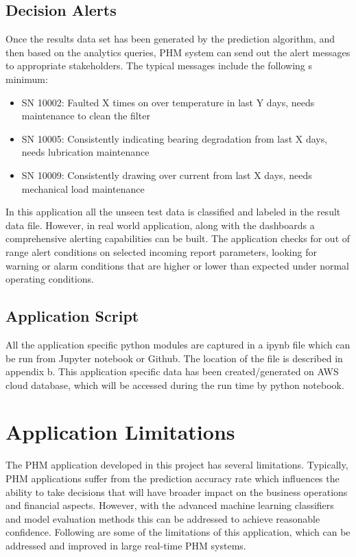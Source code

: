 \documentclass[sigconf]{acmart}
\begin{document}
\subsection{Decision Alerts}
Once the results data set has been generated by the prediction algorithm, and then based on the analytics queries, PHM system can send out the alert messages to appropriate stakeholders. The typical messages include the following s minimum:
\begin{itemize}
  \item SN 10002: Faulted X times on over temperature in last Y days, needs maintenance to clean the filter
  \item SN 10005: Consistently indicating bearing degradation from last X days, needs lubrication maintenance
\item SN 10009: Consistently drawing over current from last X days, needs mechanical load maintenance
\end{itemize}

In this application all the unseen test data is classified and labeled in the result data file. However, in real world application, along with the dashboards a comprehensive alerting capabilities can be built. The application checks for out of range alert conditions on selected incoming report parameters, looking for warning or alarm conditions that are higher or lower than expected under normal operating conditions.

\subsection{Application Script}
All the application specific python modules are captured in a ipynb file which can be run from Jupyter notebook or Github. The location of the file is described in appendix b. This application specific data has been created/generated on AWS cloud database, which will be accessed during the run time by python notebook.
\section{Application Limitations}
The PHM application developed in this project has several limitations. Typically, PHM applications suffer from the prediction accuracy rate which influences the ability to take decisions that will have broader impact on the business operations and financial aspects. However, with the advanced machine learning classifiers and model evaluation methods this can be addressed to achieve reasonable confidence. Following are some of the limitations of this application, which can be addressed and improved in large real-time PHM systems.
\end{document}
